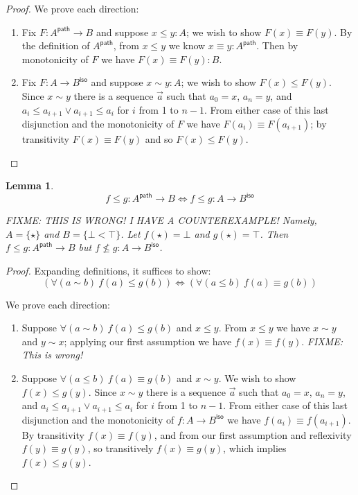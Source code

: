 \documentclass{article}
\newtheorem{lemma}{Lemma}
\newcommand{\ms}[1]{\ensuremath{\mathsf{#1}}}
\newcommand{\iso}{\ms{iso}}
\renewcommand{\path}{\ms{path}}
\newcommand{\pathto}{\sim}
\begin{document}
\begin{proof} We prove each direction:
  \begin{enumerate}
  \item Fix $F : A^\path \to B$ and suppose $x \le y : A$; we wish to show $F(x)
    \equiv F(y)$. By the definition of $A^\path$, from $x \le y$ we know $x
    \equiv y : A^\path$. Then by monotonicity of $F$ we have $F(x) \equiv F(y) :
    B$.

  \item Fix $F : A \to B^\iso$ and suppose $x \pathto y : A$; we wish to show
    $F(x) \le F(y)$. Since $x \pathto y$ there is a sequence $\vec{a}$ such that
    $a_0 = x$, $a_n = y$, and $a_i \le a_{i+1} \vee a_{i+1} \le a_i$ for $i$
    from 1 to $n-1$. From either case of this last disjunction and the
    monotonicity of $F$ we have $F(a_i) \equiv F(a_{i+1})$; by transitivity
    $F(x) \equiv F(y)$ and so $F(x) \le F(y)$.
  \end{enumerate}
\end{proof}

\begin{lemma}\label{lem:loccore-2}
  \color{red}
  \[f \le g : A^\path \to B \iff f \le g : A \to B^\iso \]

  \emph{FIXME: THIS IS WRONG! I HAVE A COUNTEREXAMPLE! Namely, $A = \{\star\}$
  and $B = \{\bot < \top\}$. Let $f(\star) = \bot$ and $g(\star) = \top$. Then
  $f \le g : A^\path \to B$ but $f \not\le g : A \to B^\iso$.}
\end{lemma}

\begin{proof}
  Expanding definitions, it suffices to show:
  \[ (\forall(a \pathto b)\ f(a) \le g(b))
  \iff
  (\forall(a \le b)\ f(a) \equiv g(b))
  \]

  We prove each direction:
  \begin{enumerate}
  \item Suppose $\forall(a \pathto b)\ f(a) \le g(b)$ and $x \le y$. From $x \le
    y$ we have $x \pathto y$ and $y \pathto x$; {\color{red} applying our first
      assumption we have $f(x) \equiv f(y)$. \emph{FIXME: This is wrong!}}

  \item Suppose $\forall(a \le b)\ f(a) \equiv g(b)$ and $x \pathto y$. We wish
    to show $f(x) \le g(y)$. Since $x \pathto y$ there is a sequence $\vec{a}$
    such that $a_0 = x$, $a_n = y$, and $a_i \le a_{i+1} \vee a_{i+1} \le a_i$
    for $i$ from 1 to $n-1$. From either case of this last disjunction and the
    monotonicity of $f : A \to B^\iso$ we have $f(a_i) \equiv f(a_{i+1})$. By
    transitivity $f(x) \equiv f(y)$, and from our first assumption and
    reflexivity $f(y) \equiv g(y)$, so transitively $f(x) \equiv g(y)$, which
    implies $f(x) \le g(y)$.
  \end{enumerate}
\end{proof}
\end{document}

